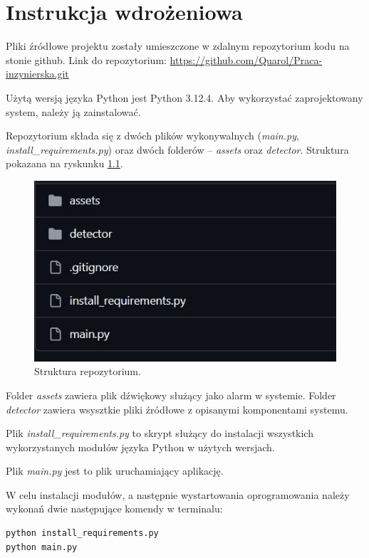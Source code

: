 \chapter{Instrukcja wdrożeniowa}
Pliki źródłowe projektu zostały umieszczone w zdalnym repozytorium kodu na stonie github. 
Link do repozytorium: \url{https://github.com/Quarol/Praca-inzynierska.git}

Użytą wersją języka Python jest Python 3.12.4. Aby wykorzystać zaprojektowany system, należy ją zainstalować.

Repozytorium składa się z dwóch plików wykonywalnych (\emph{main.py}, \emph{install\_requirements.py}) oraz dwóch folderów -- \emph{assets} oraz \emph{detector}. Struktura pokazana na ryskunku \ref{fig:repo}.
\begin{figure}
    \centering
    \includegraphics[width=\linewidth]{_repo.jpg}
    \caption{Struktura repozytorium.}
    \label{fig:repo}
\end{figure}

Folder \emph{assets} zawiera plik dźwiękowy służący jako alarm w systemie. Folder \emph{detector} zawiera wsysztkie pliki źródłowe z opisanymi komponentami systemu.

Plik \emph{install\_requirements.py} to skrypt służący do instalacji wszystkich wykorzystanych modułów języka Python w użytych wersjach.

Plik \emph{main.py} jest to plik uruchamiający aplikację.

W celu instalacji modułów, a następnie wystartowania oprogramowania należy wykonań dwie następujące komendy w terminalu:
\begin{lstlisting}
python install_requirements.py
python main.py
\end{lstlisting}


